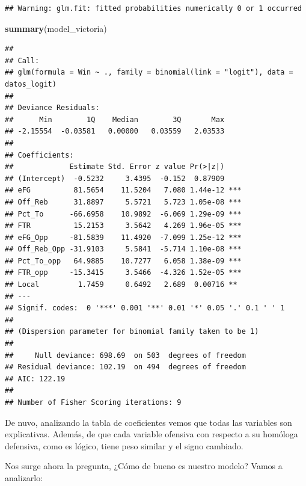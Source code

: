 \documentclass[
]{article}
\newenvironment{Shaded}{\begin{snugshade}}{\end{snugshade}}
\newcommand{\DataTypeTok}[1]{\textcolor[rgb]{0.13,0.29,0.53}{#1}}
\newcommand{\KeywordTok}[1]{\textcolor[rgb]{0.13,0.29,0.53}{\textbf{#1}}}
\newcommand{\NormalTok}[1]{#1}
\newcommand{\OperatorTok}[1]{\textcolor[rgb]{0.81,0.36,0.00}{\textbf{#1}}}
\newcommand{\StringTok}[1]{\textcolor[rgb]{0.31,0.60,0.02}{#1}}
\begin{document}
\begin{verbatim}
## Warning: glm.fit: fitted probabilities numerically 0 or 1 occurred
\end{verbatim}

\begin{Shaded}
\begin{Highlighting}[]
\KeywordTok{summary}\NormalTok{(model_victoria)}
\end{Highlighting}
\end{Shaded}

\begin{verbatim}
## 
## Call:
## glm(formula = Win ~ ., family = binomial(link = "logit"), data = datos_logit)
## 
## Deviance Residuals: 
##      Min        1Q    Median        3Q       Max  
## -2.15554  -0.03581   0.00000   0.03559   2.03533  
## 
## Coefficients:
##             Estimate Std. Error z value Pr(>|z|)    
## (Intercept)  -0.5232     3.4395  -0.152  0.87909    
## eFG          81.5654    11.5204   7.080 1.44e-12 ***
## Off_Reb      31.8897     5.5721   5.723 1.05e-08 ***
## Pct_To      -66.6958    10.9892  -6.069 1.29e-09 ***
## FTR          15.2153     3.5642   4.269 1.96e-05 ***
## eFG_Opp     -81.5839    11.4920  -7.099 1.25e-12 ***
## Off_Reb_Opp -31.9103     5.5841  -5.714 1.10e-08 ***
## Pct_To_opp   64.9885    10.7277   6.058 1.38e-09 ***
## FTR_opp     -15.3415     3.5466  -4.326 1.52e-05 ***
## Local         1.7459     0.6492   2.689  0.00716 ** 
## ---
## Signif. codes:  0 '***' 0.001 '**' 0.01 '*' 0.05 '.' 0.1 ' ' 1
## 
## (Dispersion parameter for binomial family taken to be 1)
## 
##     Null deviance: 698.69  on 503  degrees of freedom
## Residual deviance: 102.19  on 494  degrees of freedom
## AIC: 122.19
## 
## Number of Fisher Scoring iterations: 9
\end{verbatim}

De nuvo, analizando la tabla de coeficientes vemos que todas las
variables son explicativas. Además, de que cada variable ofensiva con
respecto a su homóloga defensiva, como es lógico, tiene peso similar y
el signo cambiado.

Nos surge ahora la pregunta, ¿Cómo de bueno es nuestro modelo? Vamos a
analizarlo:

\begin{Shaded}
\end{Shaded}
\end{document}
